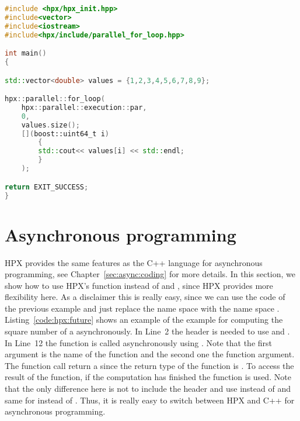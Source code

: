 \begin{lstlisting}[language=c++,caption={Parallel range-based for loops using HPX.\label{code:hpx:parallel:range:loop}},float,floatplacement=tb]
#include <hpx/hpx_init.hpp>
#include<vector>
#include<iostream>
#include<hpx/include/parallel_for_loop.hpp>

int main()
{

std::vector<double> values = {1,2,3,4,5,6,7,8,9};

hpx::parallel::for_loop(
	hpx::parallel::execution::par, 
	0, 
	values.size();
	[](boost::uint64_t i)
		{
		std::cout<< values[i] << std::endl;
		}
	);

return EXIT_SUCCESS;
}

\end{lstlisting}

\section{Asynchronous programming}
\label{sec:hpx:async}
HPX provides the same features as the C++ language for asynchronous programming, see Chapter~\ref{sec:async:coding} for more details. In this section, we show how to use HPX's function instead of  and , since HPX provides more flexibility here. As a disclaimer this is really easy, since we can use the code of the previous example and just replace the name space  with the name space . Listing~\ref{code:hpx:future} shows an example of the example for computing the square number of a asynchronously. In Line~2 the header  is needed to use  and . In Line~12 the function  is called asynchronously using . Note that the first argument is the name of the function and the second one the function argument. The function call return a  since the return type of the function is . To access the result of the function, if the computation has finished the function  is used. Note that the only difference here is not to include the header  and use  instead of  and same for  instead of . Thus, it is really easy to switch between HPX and C++ for asynchronous programming.

